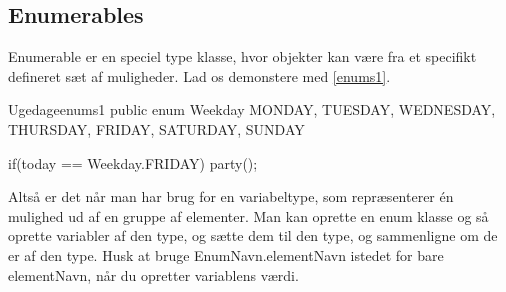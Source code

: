 \subsection{Enumerables}
Enumerable er en speciel type klasse, hvor objekter kan være fra et specifikt defineret sæt af muligheder. Lad os demonstere med \autoref{enums1}.
\begin{JavaCode}{Ugedage}{enums1}
	public enum Weekday{
		MONDAY, TUESDAY, WEDNESDAY, THURSDAY, FRIDAY, SATURDAY, SUNDAY
	}
	
	if(today == Weekday.FRIDAY){
		party();
	}
\end{JavaCode}
Altså er det når man har brug for en variabeltype, som repræsenterer én mulighed ud af en gruppe af elementer. Man kan oprette en enum klasse og så oprette variabler af den type, og sætte dem til den type, og sammenligne om de er af den type. Husk at bruge EnumNavn.elementNavn istedet for bare elementNavn, når du opretter variablens værdi.

